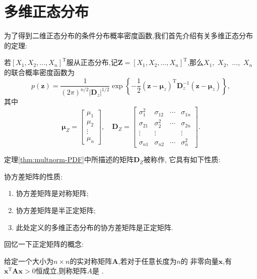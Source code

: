 \documentclass[cn,10pt,citestyle=gb7714-2015,bibstyle=gb7714-2015]{elegantbook}
\newcommand{\mT}{\mathrm{T}}
\begin{document}
\section{多维正态分布}\label{sec:high-dimension-gaussion-distribute}
为了得到二维正态分布的条件分布概率密度函数,我们首先介绍有关多维正态分布的定理:
\begin{theorem}[多维正态随机变量的联合分布]\label{thm:multnorm-PDF}
  若$[X_1,X_2,...,X_n]^\mT$服从正态分布,记$\bm{Z}=[X_1,X_2,...,X_n]^\mT$,那么$X_1$,\ $X_2$,\ $\ldots$,\ $X_n$的联合概率密度函数为
  \begin{equation}\label{eq:multnorm-PDF}
    p(\bm{z})=\frac{1}{(2\pi)^{n/2}|\bm{D}_z|^{1/2}}\exp\left\{-\frac12(\bm{z}-\bm{\mu}_z)^\mT\bm{D}_z^{-1}(\bm{z}-\bm{\mu}_z)\right\},
  \end{equation}
  其中
  \[
      \bm{\mu}_Z=\begin{bmatrix}
        \mu_{1}\\
        \mu_{2}\\
        \vdots\\
        \mu_{n}
      \end{bmatrix},\quad
      \bm{D}_Z=\begin{bmatrix}
        \sigma_1^2&\sigma_{12}&\cdots&\sigma_{1n}\\
        \sigma_{21}&\sigma_2^2&\cdots&\sigma_{2n}\\
        \vdots&\vdots& &\vdots\\
        \sigma_{n1}&\sigma_{n2}&\cdots&\sigma_{n}^2
      \end{bmatrix}.
  \]
\end{theorem}
定理\ref{thm:multnorm-PDF}中所描述的矩阵$\bm{D}_Z$被称作,
它具有如下性质:\begin{property}协方差矩阵的性质:
  \begin{enumerate}
    \item 协方差矩阵是\colorbox{yellow!20}{对称矩阵};
    \item 协方差矩阵是\colorbox{yellow!20}{半正定矩阵};
    \item 此处定义的多维正态分布的协方差矩阵是\colorbox{yellow!20}{正定矩阵}.
  \end{enumerate}
\end{property}
回忆一下正定矩阵的概念:
\begin{definition}[正定矩阵]\label{def:pos-def-matrix}
  给定一个大小为$n\times n$的实对称矩阵$\bm{A}$,若对于任意长度为$n$的
  非零向量$\bm{x}$,有$\bm{x}^\mT\bm{A}\bm{x}>0$恒成立,则称矩阵$A$是
  .
\end{definition}
\end{document}
